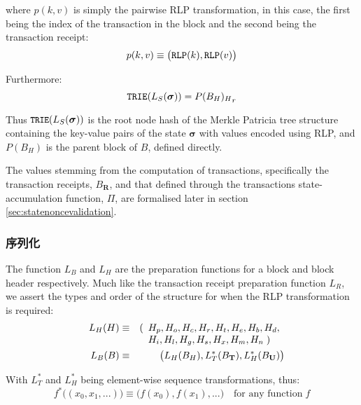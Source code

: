 \documentclass[UTF8,nofonts]{ctexart}
\begin{document}
\begin{multicols}{2}
where $p(k, v)$ is simply the pairwise RLP transformation, in this case, the first being the index of the transaction in the block and the second being the transaction receipt:
\begin{equation}
p(k, v) \equiv \big( \mathtt{\small RLP}(k), \mathtt{\small RLP}(v) \big)
\end{equation}

Furthermore:
\begin{equation}
\mathtt{\small TRIE}(L_S(\boldsymbol{\sigma})) = {P(B_H)_H}_r
\end{equation}

Thus $\texttt{\small TRIE}(L_S(\boldsymbol{\sigma}))$ is the root node hash of the Merkle Patricia tree structure containing the key-value pairs of the state $\boldsymbol{\sigma}$ with values encoded using RLP, and $P(B_H)$ is the parent block of $B$, defined directly.

The values stemming from the computation of transactions, specifically the transaction receipts, $B_\mathbf{R}$, and that defined through the transactions state-accumulation function, $\Pi$, are formalised later in section \ref{sec:statenoncevalidation}.

\subsubsection{序列化}

The function $L_B$ and $L_H$ are the preparation functions for a block and block header respectively. Much like the transaction receipt preparation function $L_R$, we assert the types and order of the structure for when the RLP transformation is required:
\begin{eqnarray}
\quad L_H(H) & \equiv & (\begin{array}[t]{l}H_p, H_o, H_c, H_r, H_t, H_e, H_b, H_d,\\ H_i, H_l, H_g, H_s, H_x, H_m, H_n \; )\end{array} \\
\quad L_B(B) & \equiv & \big( L_H(B_H), L_T^*(B_\mathbf{T}), L_H^*(B_\mathbf{U}) \big)
\end{eqnarray}

With $L_T^*$ and $L_H^*$ being element-wise sequence transformations, thus:
\begin{equation}
f^*\big( (x_0, x_1, ...) \big) \equiv \big( f(x_0), f(x_1), ... \big) \quad \text{for any function} \; f
\end{equation}


\end{multicols}
\end{document}
